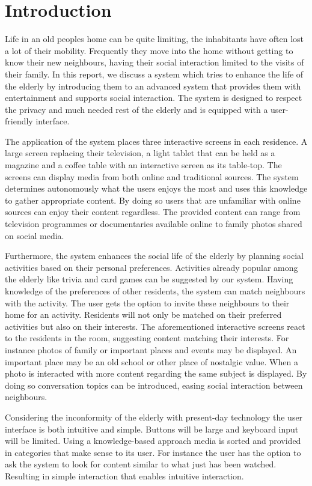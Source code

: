 \documentclass[12pt, a4paper]{article}
\begin{document}
\tableofcontents 
\newpage
\section{Introduction}

Life in an old peoples home can be quite limiting, the inhabitants have often lost a lot of their mobility. Frequently they move into the home without getting to know their new neighbours, having their social interaction limited to the visits of their family. In this report, we discuss a system which tries to enhance the life of the elderly by introducing them to an advanced system that provides them with entertainment and supports social interaction. The system is designed to respect the privacy and much needed rest of the elderly and is equipped with a user-friendly interface.

The application of the system places three interactive screens in each residence. A large screen replacing their television, a light tablet that can be held as a magazine and a coffee table with an interactive screen as its table-top. The screens can display media from both online and traditional sources. The system determines autonomously what the users enjoys the most and uses this knowledge to gather appropriate content. By doing so users that are unfamiliar with online sources can enjoy their content regardless. The provided content can range from television programmes or documentaries available online to family photos shared on social media.

Furthermore, the system enhances the social life of the elderly by planning social activities based on their personal preferences. Activities already popular among the elderly like trivia and card games can be suggested by our system. Having knowledge of the preferences of other residents, the system can match neighbours with the activity. The user gets the option to invite these neighbours to their home for an activity. Residents will not only be matched on their preferred activities but also on their interests. The aforementioned interactive screens react to the residents in the room, suggesting content matching their interests. For instance photos of family or important places and events may be displayed. An important place may be an old school or other place of nostalgic value. When a photo is interacted with more content regarding the same subject is displayed. By doing so conversation topics can be introduced, easing social interaction between neighbours.

Considering the inconformity of the elderly with present-day technology the user interface is both intuitive and simple. Buttons will be large and keyboard input will be limited. Using a knowledge-based approach media is sorted and provided in categories that make sense to its user. For instance the user has the option to ask the system to look for content similar to what just has been watched. Resulting in simple interaction that enables intuitive interaction.
\end{document}
